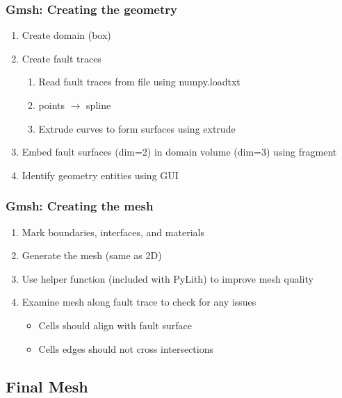 \documentclass[aspectratio=169]{beamer}
\begin{document}
\begin{frame}
  \frametitle{Gmsh: Creating the geometry}
  \summary{}
  
  \begin{enumerate}
  \item Create domain (box)\pause
  \item Create fault traces
    \begin{enumerate}
    \item Read fault traces from file using {\ttfamily numpy.loadtxt}
    \item points $\rightarrow$ spline
    \item Extrude curves to form surfaces using {\ttfamily extrude}
    \end{enumerate}\pause
  \item Embed fault surfaces (dim=2) in domain volume (dim=3) using {\ttfamily fragment}\pause
  \item Identify geometry entities using GUI
  \end{enumerate}
  
\end{frame}


\begin{frame}
  \frametitle{Gmsh: Creating the mesh}
  
  \begin{enumerate}
  \item Mark boundaries, interfaces, and materials
  \item Generate the mesh (same as 2D)
  \item Use helper function (included with PyLith) to improve mesh quality
  \item Examine mesh along fault trace to check for any issues
    \begin{itemize}
    \item Cells should align with fault surface
    \item Cells edges should not cross intersections
    \end{itemize}
  \end{enumerate}
  
\end{frame}


\subsection{Final Mesh}
\end{document}
